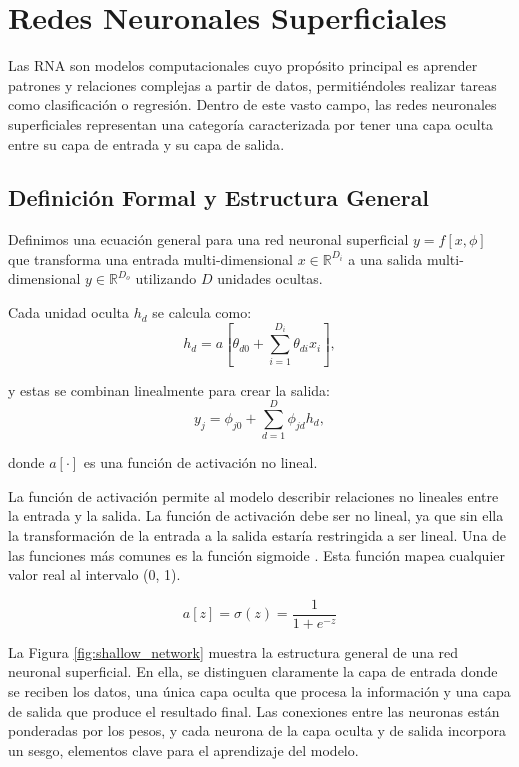 \section{Redes Neuronales Superficiales} 

Las RNA son modelos computacionales cuyo propósito principal es aprender patrones y relaciones complejas a partir de datos, permitiéndoles realizar tareas como clasificación o regresión. Dentro de este vasto campo, las redes neuronales superficiales representan una categoría caracterizada por tener una capa oculta entre su capa de entrada y su capa de salida\cite{Goodfellow16}.

\subsection{Definición Formal y Estructura General}\label{sec:shallow_general_case}
Definimos una ecuación general para una red neuronal superficial $y = f[x, \phi]$ que transforma una entrada multi-dimensional $x \in \mathbb{R}^{D_i}$ a una salida multi-dimensional $y \in \mathbb{R}^{D_o}$ utilizando $D$ unidades ocultas.

Cada unidad oculta $h_d$ se calcula como:
\begin{equation}
h_d = a\left[\theta_{d0} + \sum_{i=1}^{D_i} \theta_{di}x_i\right],
\label{eq:hidden_unit}
\end{equation}

y estas se combinan linealmente para crear la salida:
\begin{equation}
y_j = \phi_{j0} + \sum_{d=1}^{D} \phi_{jd}h_d,
\label{eq:output_unit}
\end{equation}

donde $a[\cdot]$ es una función de activación no lineal.

La función de activación permite al modelo describir relaciones no lineales entre la entrada y la salida. La función de activación debe ser no lineal, ya que sin ella la transformación de la entrada a la salida estaría restringida a ser lineal. Una de las funciones más comunes es la función sigmoide \cite{Goodfellow16}. Esta función mapea cualquier valor real al intervalo (0, 1).

\begin{equation}
a[z] = \sigma(z) = \frac{1}{1 + e^{-z}}
\label{eq:sigmoid_definition}
\end{equation}

 La Figura \ref{fig:shallow_network} muestra la estructura general de una red neuronal superficial. En ella, se distinguen claramente la capa de entrada donde se reciben los datos, una única capa oculta que procesa la información y una capa de salida que produce el resultado final. Las conexiones entre las neuronas están ponderadas por los pesos, y cada neurona de la capa oculta y de salida incorpora un sesgo, elementos clave para el aprendizaje del modelo.

